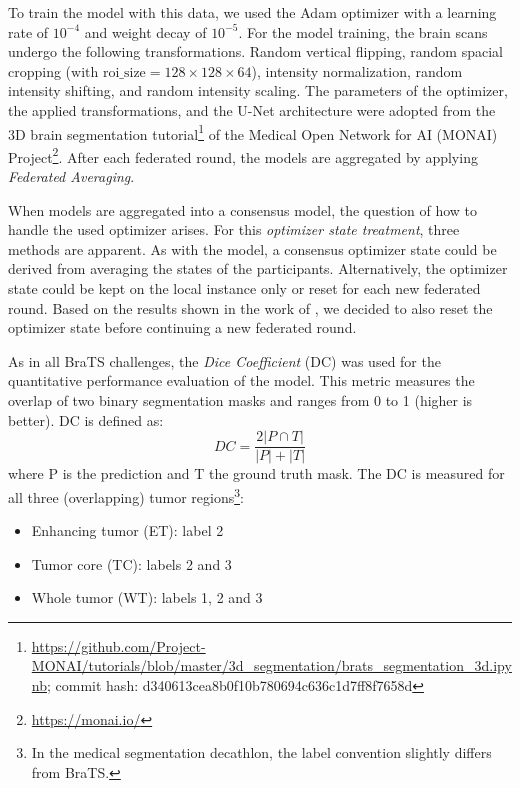 To train the model with this data, we used the Adam optimizer \citep{Kingma2014Adam:Optimization} with a 
learning rate of $10^{-4}$
and weight decay of $10^{-5}$.
For the model training, the brain scans undergo the following transformations.
Random vertical flipping,
random spacial cropping ($\textrm{with roi\_size} =  128 \times 128 \times 64$),
intensity normalization,
random intensity shifting,
and random intensity scaling.
The parameters of the optimizer, the applied transformations, and the U-Net architecture were adopted from the 3D brain segmentation tutorial\footnote{\url{https://github.com/Project-MONAI/tutorials/blob/master/3d\_segmentation/brats\_segmentation\_3d.ipynb}; commit hash: d340613cea8b0f10b780694c636c1d7ff8f7658d}
of the Medical Open Network for AI (MONAI) Project\footnote{\url{https://monai.io/}}. After each federated round, the models are aggregated by applying \textit{Federated Averaging}.

When models are aggregated into a consensus model, the question of how to handle the used optimizer arises. For this \textit{optimizer state treatment}, three methods are apparent. As with the model, a consensus optimizer state could be derived from averaging the states of the participants. Alternatively, the optimizer state could be kept on the local instance only or reset for each new federated round. Based on the results shown in the work of \cite{Li2019Privacy-preservingSegmentation}, we decided to also reset the optimizer state before continuing a new federated round.

As in all BraTS challenges, the \textit{Dice Coefficient} (DC) was used for the quantitative performance evaluation of the model.
This metric measures the overlap of two binary segmentation masks and ranges from 0 to 1 (higher is better). DC is defined as:
\begin{equation}
DC=\frac{2 |P \cap T|}{|P| + |T|} \label{eq:dice}
\end{equation}
where P is the prediction and T the ground truth mask. The DC is measured for all three (overlapping) tumor regions\footnote{In the medical segmentation decathlon, the label convention slightly differs from BraTS.}:
\begin{itemize}
    \item Enhancing tumor (ET): label 2
    \item Tumor core (TC): labels 2 and 3
    \item Whole tumor (WT): labels 1, 2 and 3
\end{itemize}

